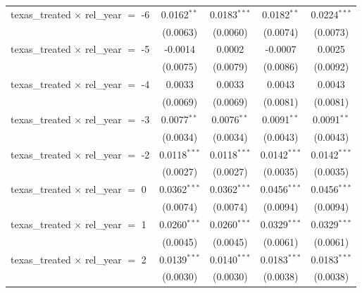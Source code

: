 \begin{tabular}{lcccc}
   texas\_treated $\times$ rel\_year $=$ -6     & 0.0162$^{**}$  & 0.0183$^{***}$        & 0.0182$^{**}$   & 0.0224$^{***}$\\   
                                                & (0.0063)       & (0.0060)              & (0.0074)        & (0.0073)\\   
   texas\_treated $\times$ rel\_year $=$ -5     & -0.0014        & 0.0002                & -0.0007         & 0.0025\\   
                                                & (0.0075)       & (0.0079)              & (0.0086)        & (0.0092)\\   
   texas\_treated $\times$ rel\_year $=$ -4     & 0.0033         & 0.0033                & 0.0043          & 0.0043\\   
                                                & (0.0069)       & (0.0069)              & (0.0081)        & (0.0081)\\   
   texas\_treated $\times$ rel\_year $=$ -3     & 0.0077$^{**}$  & 0.0076$^{**}$         & 0.0091$^{**}$   & 0.0091$^{**}$\\   
                                                & (0.0034)       & (0.0034)              & (0.0043)        & (0.0043)\\   
   texas\_treated $\times$ rel\_year $=$ -2     & 0.0118$^{***}$ & 0.0118$^{***}$        & 0.0142$^{***}$  & 0.0142$^{***}$\\   
                                                & (0.0027)       & (0.0027)              & (0.0035)        & (0.0035)\\   
   texas\_treated $\times$ rel\_year $=$ 0      & 0.0362$^{***}$ & 0.0362$^{***}$        & 0.0456$^{***}$  & 0.0456$^{***}$\\   
                                                & (0.0074)       & (0.0074)              & (0.0094)        & (0.0094)\\   
   texas\_treated $\times$ rel\_year $=$ 1      & 0.0260$^{***}$ & 0.0260$^{***}$        & 0.0329$^{***}$  & 0.0329$^{***}$\\   
                                                & (0.0045)       & (0.0045)              & (0.0061)        & (0.0061)\\   
   texas\_treated $\times$ rel\_year $=$ 2      & 0.0139$^{***}$ & 0.0140$^{***}$        & 0.0183$^{***}$  & 0.0183$^{***}$\\   
                                                & (0.0030)       & (0.0030)              & (0.0038)        & (0.0038)\\   

\end{tabular}
